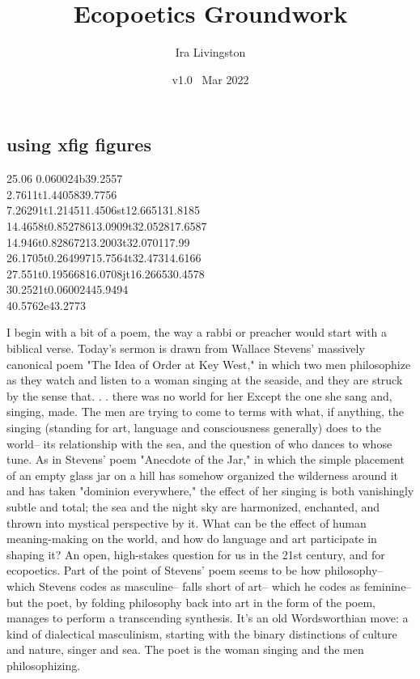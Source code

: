 \documentclass[draft]{article}
\title{Ecopoetics Groundwork}
\author{Ira Livingston}
\date{v1.0 \ Mar 2022}
\begin{document}
\maketitle
\subsection{using xfig figures}

\def\whoalpar#1{\shapepar{\whoalshape}#1\par}
\def\whoalshape{%
{25.06}%
{0.060024}b{39.2557}\\%
{2.7611}t{1.44058}{39.7756}\\%
{7.26291}t{1.2145}{11.4506}st{12.6651}{31.8185}\\%
{14.4658}t{0.852786}{13.0909}t{32.0528}{17.6587}\\%
{14.946}t{0.828672}{13.2003}t{32.0701}{17.99}\\%
{26.1705}t{0.264997}{15.7564}t{32.473}{14.6166}\\%
{27.551}t{0.195668}{16.0708}jt{16.2665}{30.4578}\\%
{30.2521}t{0.060024}{45.9494}\\%
{40.5762}e{43.2773}%
}


\shapepar\whoalshape
I begin with a bit of a poem, the way a rabbi or preacher would start with a biblical verse. Today's sermon is drawn from Wallace Stevens' massively canonical poem "The Idea of Order at Key West," in which two men philosophize as they watch and listen to a woman singing at the seaside, and they are struck by the sense that. . . there was no world for her Except the one she sang and, singing, made. The men are trying to come to terms with what, if anything, the singing (standing for art, language and consciousness generally) does to the world-- its relationship with the sea, and the question of who dances to whose tune. As in Stevens' poem "Anecdote of the Jar," in which the simple placement of an empty glass jar on a hill has somehow organized the wilderness around it and has taken "dominion everywhere," the effect of her singing is both vanishingly subtle and total; the sea and the night sky are harmonized, enchanted, and thrown into mystical perspective by it. What can be the effect of human meaning-making on the world, and how do language and art participate in shaping it? An open, high-stakes question for us in the 21st century, and for ecopoetics. Part of the point of Stevens' poem seems to be how philosophy-- which Stevens codes as masculine-- falls short of art-- which he codes as feminine-- but the poet, by folding philosophy back into art in the form of the poem, manages to perform a transcending synthesis. It's an old Wordsworthian move: a kind of dialectical masculinism, starting with the binary distinctions of culture and nature, singer and sea. The poet is the woman singing and the men philosophizing.
\end{document}
